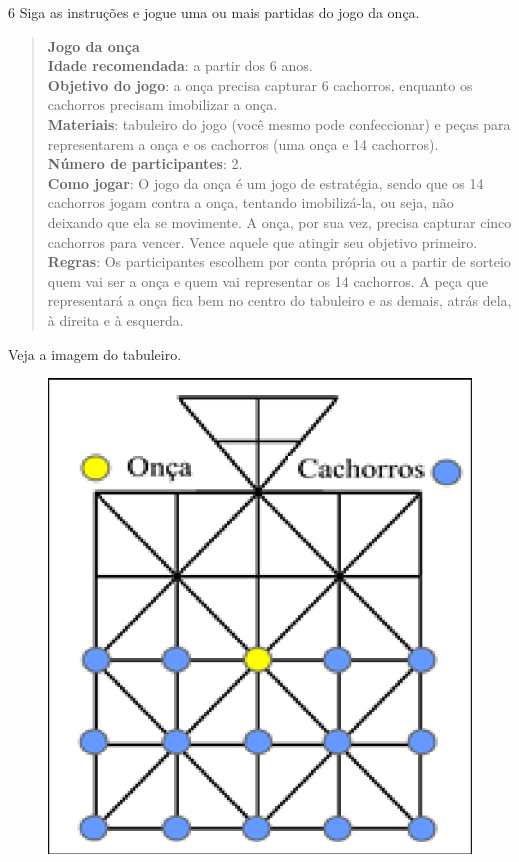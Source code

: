 \num{6} Siga as instruções e jogue uma ou mais partidas do jogo da onça.

\begin{quote}
\textbf{Jogo da onça}\\
\textbf{Idade recomendada}: a partir dos 6 anos.\\
\textbf{Objetivo do jogo}: a onça precisa capturar 6 cachorros, enquanto
os cachorros precisam imobilizar a onça.\\
\textbf{Materiais}: tabuleiro do jogo (você mesmo pode confeccionar) e
peças para representarem a onça e os cachorros (uma onça e 14
cachorros).\\
\textbf{Número de participantes}: 2.\\
\textbf{Como jogar}: O jogo da onça é um jogo de estratégia, sendo que
os 14 cachorros jogam contra a onça, tentando imobilizá-la, ou seja, não
deixando que ela se movimente. A onça, por sua vez, precisa capturar
cinco cachorros para vencer. Vence aquele que atingir seu objetivo
primeiro.\\
\textbf{Regras}: Os participantes escolhem por conta própria ou a partir
de sorteio quem vai ser a onça e quem vai representar os 14 cachorros. A
peça que representará a onça fica bem no centro do tabuleiro e as
demais, atrás dela, à direita e à esquerda.
\end{quote}

Veja a imagem do tabuleiro.

\begin{figure}[htpb!]
\includegraphics[width=\textwidth]{./imgs/art26.png}
\end{figure}

